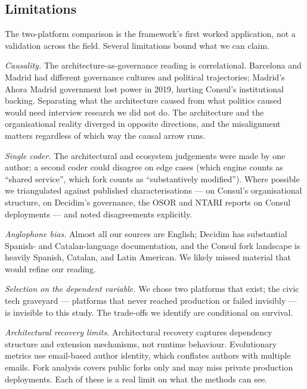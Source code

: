 \documentclass[11pt,a4paper]{article}
\begin{document}
\subsection{Limitations}\label{sec:evaluation}

The two-platform comparison is the framework's first worked application, not a validation across the field. Several limitations bound what we can claim.

\emph{Causality.} The architecture-as-governance reading is correlational. Barcelona and Madrid had different governance cultures and political trajectories; Madrid's Ahora Madrid government lost power in 2019, hurting Consul's institutional backing. Separating what the architecture caused from what politics caused would need interview research we did not do. The architecture and the organisational reality diverged in opposite directions, and the misalignment matters regardless of which way the causal arrow runs.

\emph{Single coder.} The architectural and ecosystem judgements were made by one author; a second coder could disagree on edge cases (which engine counts as ``shared service'', which fork counts as ``substantively modified''). Where possible we triangulated against published characterisations --- \citet{linaker2025consul} on Consul's organisational structure, \citet{barandiaran2024decidim} on Decidim's governance, the OSOR and NTARI reports on Consul deployments --- and noted disagreements explicitly.

\emph{Anglophone bias.} Almost all our sources are English; Decidim has substantial Spanish- and Catalan-language documentation, and the Consul fork landscape is heavily Spanish, Catalan, and Latin American. We likely missed material that would refine our reading.

\emph{Selection on the dependent variable.} We chose two platforms that exist; the civic tech graveyard --- platforms that never reached production or failed invisibly --- is invisible to this study. The trade-offs we identify are conditional on survival.

\emph{Architectural recovery limits.} Architectural recovery captures dependency structure and extension mechanisms, not runtime behaviour. Evolutionary metrics use email-based author identity, which conflates authors with multiple emails. Fork analysis covers public forks only and may miss private production deployments. Each of these is a real limit on what the methods can see.

\end{document}
